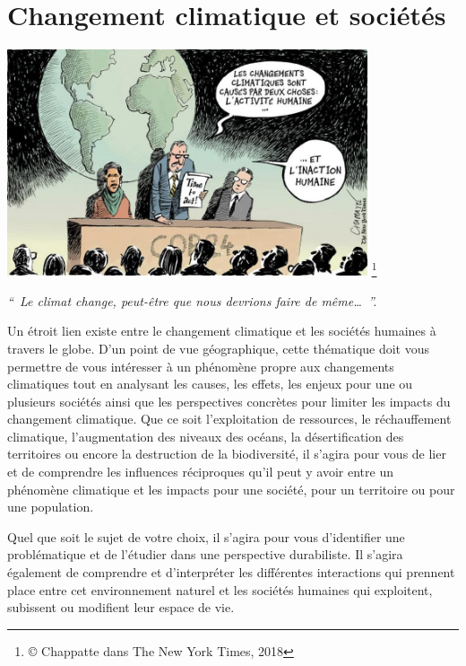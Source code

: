 \documentclass[
  10pt,
  french,
  a5paper,
  openany]{book}
\begin{document}
\hypertarget{changement-climatique-et-sociuxe9tuxe9s}{%
\chapter{Changement climatique et sociétés}\label{changement-climatique-et-sociuxe9tuxe9s}}

\begin{center}
\includegraphics[width=\textwidth,height=18em]{images/changement-climatique-et-societes.jpg}
\footnote{© Chappatte dans The New York Times, 2018}

\end{center}


\emph{``~Le climat change, peut-être que nous devrions faire de même\ldots~''.}


Un étroit lien existe entre le changement climatique et les sociétés humaines à travers le globe. D'un point de vue géographique, cette thématique doit vous permettre de vous intéresser à un phénomène propre aux changements climatiques tout en analysant les causes, les effets, les enjeux pour une ou plusieurs sociétés ainsi que les perspectives concrètes pour limiter les impacts du changement climatique. Que ce soit l'exploitation de ressources, le réchauffement climatique, l'augmentation des niveaux des océans, la désertification des territoires ou encore la destruction de la biodiversité, il s'agira pour vous de lier et de comprendre les influences réciproques qu'il peut y avoir entre un phénomène climatique et les impacts pour une société, pour un territoire ou pour une population.

\clearpage

Quel que soit le sujet de votre choix, il s'agira pour vous d'identifier une problématique et de l'étudier dans une perspective durabiliste. Il s'agira également de comprendre et d'interpréter les différentes interactions qui prennent place entre cet environnement naturel et les sociétés humaines qui exploitent, subissent ou modifient leur espace de vie.
\end{document}
